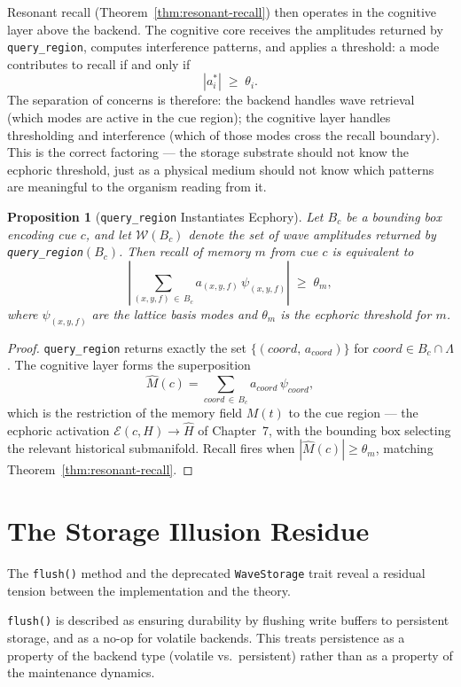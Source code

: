 \documentclass[12pt, oneside]{book}
\theoremstyle{plain}
\newtheorem{proposition}[theorem]{Proposition}
\theoremstyle{definition}
\theoremstyle{remark}
\begin{document}
Resonant recall (Theorem~\ref{thm:resonant-recall}) then
operates in the cognitive layer above the backend.
The cognitive core receives the amplitudes returned by
\texttt{query\_region}, computes interference patterns, and
applies a threshold: a mode contributes to recall if and only if
\[
  |a_i^*| \;\geq\; \theta_i.
\]
The separation of concerns is therefore: the backend handles
wave retrieval (which modes are active in the cue region);
the cognitive layer handles thresholding and interference
(which of those modes cross the recall boundary).
This is the correct factoring --- the storage substrate should
not know the ecphoric threshold, just as a physical medium
should not know which patterns are meaningful to the organism
reading from it.

\begin{proposition}[\texttt{query\_region} Instantiates Ecphory]
\label{prop:query-ecphory}
Let $B_c$ be a bounding box encoding cue $c$,
and let $\mathcal{W}(B_c)$ denote the set of wave amplitudes
returned by \texttt{query\_region}$(B_c)$.
Then recall of memory $m$ from cue $c$ is equivalent to
\[
  \left|
    \sum_{(x,y,f)\,\in\, B_c}
    a_{(x,y,f)}\,\psi_{(x,y,f)}
  \right|
  \;\geq\; \theta_m,
\]
where $\psi_{(x,y,f)}$ are the lattice basis modes and
$\theta_m$ is the ecphoric threshold for $m$.
\end{proposition}

\begin{proof}
\texttt{query\_region} returns exactly the set
$\{(\mathit{coord},\, a_{\mathit{coord}})\}$
for $\mathit{coord} \in B_c \cap \Lambda$.
The cognitive layer forms the superposition
\[
  \hat{M}(c)
  = \sum_{\mathit{coord}\,\in\, B_c} a_{\mathit{coord}}\,\psi_{\mathit{coord}},
\]
which is the restriction of the memory field $M(t)$ to the cue
region --- the ecphoric activation $\mathcal{E}(c,H) \to \hat{H}$
of Chapter~7, with the bounding box selecting the relevant
historical submanifold.
Recall fires when $|\hat{M}(c)| \geq \theta_m$,
matching Theorem~\ref{thm:resonant-recall}.
\end{proof}

\section{The Storage Illusion Residue}

The \texttt{flush()} method and the deprecated
\texttt{WaveStorage} trait reveal a residual tension between
the implementation and the theory.

\texttt{flush()} is described as ensuring durability by
flushing write buffers to persistent storage, and as a no-op
for volatile backends.
This treats persistence as a property of the backend type
(volatile vs.\ persistent) rather than as a property of the
maintenance dynamics.
\end{document}
